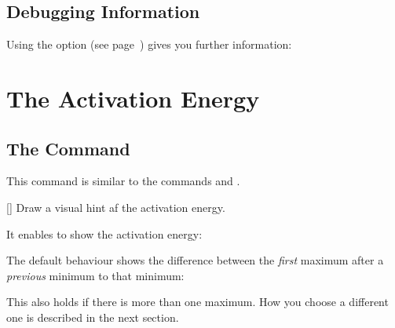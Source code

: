 \documentclass[load-preamble+]{cnltx-doc}
\begin{document}
\subsection{Debugging Information}
Using the  option (see page~\pageref{key:debug}) gives you
further information:
\begin{example}
  \begin{endiagram}[debug]
    \ShowGain
  \end{endiagram}
\end{example}

\section{The Activation Energy}
\subsection{The  Command}
This command is similar to the commands  and .
\begin{commands}
  []
    Draw a visual hint af the activation energy.
\end{commands}

It enables to show the activation energy:
\begin{example}
  \begin{endiagram}
    \ShowEa
  \end{endiagram}
\end{example}

The default behaviour shows the difference between the \emph{first} maximum
after a \emph{previous} minimum to that minimum:
\begin{example}
  \begin{endiagram}
    \ShowEa
  \end{endiagram}
\end{example}

This also holds if there is more than one maximum.  How you choose a different
one is described in the next section.
\begin{example}
  \begin{endiagram}
    \ShowEa
  \end{endiagram}
\end{example}
\end{document}
